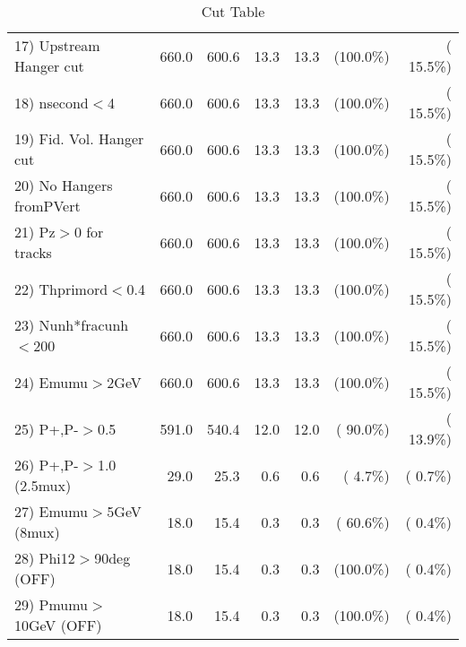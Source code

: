 \begin{table}[h!]
\begin{tabular}{||l||r|r|r|r|r|r||}
 17) Upstream Hanger cut  &        660.0 &        600.6 &         13.3 &         13.3 & (100.0\%) & ( 15.5\%) \\
 18) nsecond$<$4          &        660.0 &        600.6 &         13.3 &         13.3 & (100.0\%) & ( 15.5\%) \\
 19) Fid. Vol. Hanger cut &        660.0 &        600.6 &         13.3 &         13.3 & (100.0\%) & ( 15.5\%) \\
 20) No Hangers fromPVert &        660.0 &        600.6 &         13.3 &         13.3 & (100.0\%) & ( 15.5\%) \\
 21) Pz$>$0 for tracks    &        660.0 &        600.6 &         13.3 &         13.3 & (100.0\%) & ( 15.5\%) \\
 22) Thprimord$<$0.4      &        660.0 &        600.6 &         13.3 &         13.3 & (100.0\%) & ( 15.5\%) \\
 23) Nunh*fracunh$<$200   &        660.0 &        600.6 &         13.3 &         13.3 & (100.0\%) & ( 15.5\%) \\
 24) Emumu$>$2GeV         &        660.0 &        600.6 &         13.3 &         13.3 & (100.0\%) & ( 15.5\%) \\
 25) P+,P-$>$0.5          &        591.0 &        540.4 &         12.0 &         12.0 & ( 90.0\%) & ( 13.9\%) \\
 26) P+,P-$>$1.0 (2.5mux) &         29.0 &         25.3 &          0.6 &          0.6 & (  4.7\%) & (  0.7\%) \\
 27) Emumu$>$5GeV  (8mux) &         18.0 &         15.4 &          0.3 &          0.3 & ( 60.6\%) & (  0.4\%) \\
 28) Phi12$>$90deg  (OFF) &         18.0 &         15.4 &          0.3 &          0.3 & (100.0\%) & (  0.4\%) \\
 29) Pmumu$>$10GeV  (OFF) &         18.0 &         15.4 &          0.3 &          0.3 & (100.0\%) & (  0.4\%) \\
 \hline
 \hline
 \end{tabular}
 \caption{Cut Table           }
 \label{tab-cutheavy_neutrino_1.000}
 \end{table}
